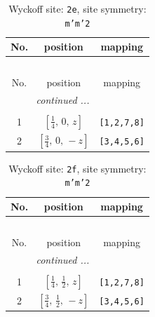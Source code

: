 \documentclass[fleqn,8pt]{jsarticle}
\begin{document}
\begin{longtable}{ccc}
\caption{Wyckoff site: {\tt 2e}, site symmetry: {\tt m'm'2}}
 \\
 \hline \hline
No. & position & mapping \\ \hline \endfirsthead

\multicolumn{2}{l}{\tablename\ \thetable{}} \\
 \hline \hline
No. & position & mapping \\ \hline \endhead

 \hline \hline
\multicolumn{2}{r}{\footnotesize\it continued ...} \\ \endfoot

 \hline \hline
\multicolumn{2}{r}{} \\ \endlastfoot

1 & $\left[ \frac{1}{4},\, 0,\, z \right]$ & {\tt [1,2,7,8]} \\ \hline
2 & $\left[ \frac{3}{4},\, 0,\, - z \right]$ & {\tt [3,4,5,6]} \\
\end{longtable}
\renewcommand{\arraystretch}{1.2}
\begin{longtable}{ccc}
\caption{Wyckoff site: {\tt 2f}, site symmetry: {\tt m'm'2}}
 \\
 \hline \hline
No. & position & mapping \\ \hline \endfirsthead

\multicolumn{2}{l}{\tablename\ \thetable{}} \\
 \hline \hline
No. & position & mapping \\ \hline \endhead

 \hline \hline
\multicolumn{2}{r}{\footnotesize\it continued ...} \\ \endfoot

 \hline \hline
\multicolumn{2}{r}{} \\ \endlastfoot

1 & $\left[ \frac{1}{4},\, \frac{1}{2},\, z \right]$ & {\tt [1,2,7,8]} \\ \hline
2 & $\left[ \frac{3}{4},\, \frac{1}{2},\, - z \right]$ & {\tt [3,4,5,6]} \\
\end{longtable}
\renewcommand{\arraystretch}{1.2}
\end{document}
